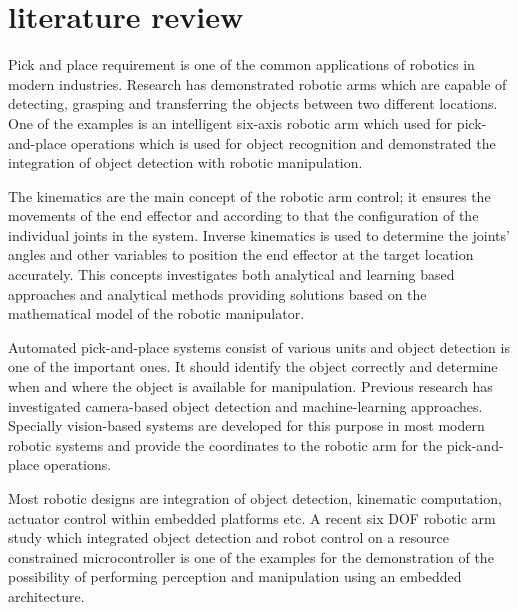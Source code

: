 \section{literature review}

Pick and place requirement is one of the common applications of robotics in modern industries. Research has demonstrated robotic arms which are capable of detecting, grasping and transferring the objects between two different locations. One of the examples is an intelligent six-axis robotic arm which used for pick-and-place operations which is used for object recognition and demonstrated the integration of object detection with robotic manipulation.\cite{tung2023}

The kinematics are the main concept of the robotic arm control; it ensures the movements of the end effector and according to that the configuration of the individual joints in the system. Inverse kinematics is used to determine the joints’ angles and other variables to position the end effector at the target location accurately. This concepts investigates both analytical and learning based approaches and analytical methods providing solutions based on the mathematical model of the robotic manipulator.\cite{wagaa2023}

Automated pick-and-place systems consist of various units and object detection is one of the important ones. It should identify the object correctly and determine when and where the object is available for manipulation. Previous research has investigated camera-based object detection and machine-learning approaches. Specially vision-based systems are developed for this purpose in most modern robotic systems and provide the coordinates to the robotic arm for the pick-and-place operations. \cite{kumar2014}

Most robotic designs are integration of object detection, kinematic computation, actuator control within embedded platforms etc. A recent six DOF robotic arm study which integrated object detection and robot control on a resource constrained microcontroller is one of the examples for the demonstration of the possibility of performing perception and manipulation using an embedded architecture.\cite{almaliki2026}
